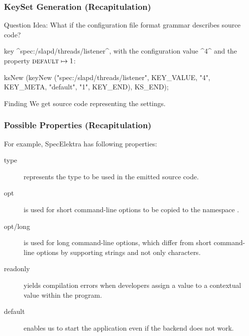 \begin{frame}[fragile]
	\frametitle{KeySet Generation (Recapitulation)}
	\begin{alertblock}{Question}
	Idea: What if the configuration file format grammar describes source code?
	\end{alertblock}

	\pause

	key ^spec:/slapd/threads/listener^, with the configuration value ^4^ and the property ${\textsc{default}} \mapsto 1$:

	\begin{code}[gobble=4,language=Cpp]
	ksNew (keyNew ("spec:/slapd/threads/listener",
		       KEY_VALUE, "4",
		       KEY_META, "default", "1",
		       KEY_END),
	       KS_END);
	\end{code}

	\begin{alertblock}{Finding}
	We get source code representing the settings.
	\end{alertblock}
\end{frame}

\begin{frame}
	\frametitle{Possible Properties (Recapitulation)}

	\pause

	For example, SpecElektra has following properties:
	\begin{description}
	\item[type] represents the type to be used in the emitted source code.
	\item[opt] is used for short command-line options to be copied to the namespace .
	\item[opt/long] is used for long command-line options, which differ from short command-line options by supporting strings and not only characters.
	\item[readonly] yields compilation errors when developers assign a value to a contextual value within the program.
	\item[default] enables us to start the application even if the backend does not work.
	\end{description}
\end{frame}

